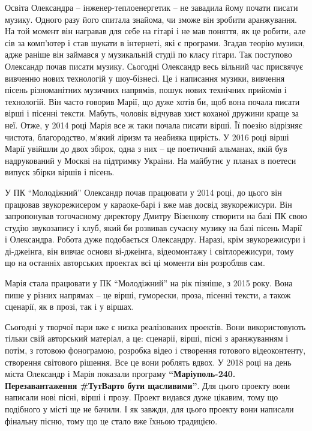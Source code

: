 
Освіта Олександра – інженер-теплоенергетик – не завадила йому почати писати
музику. Одного разу його спитала знайома, чи зможе він зробити аранжування. На
той момент він награвав для себе на гітарі і не мав поняття, як це робити, але
сів за комп'ютер і став шукати в інтернеті, які є програми. Згадав теорію
музики, адже раніше він займався у музикальній студії по класу гітари. Так
поступово Олександр почав писати музику. Сьогодні Олександр весь вільний час
присвячує вивченню нових технологій у шоу-бізнесі. Це і написання музики,
вивчення пісень різноманітних музичних напрямів, пошук нових технічних прийомів
і технологій. Він часто говорив Марії, що дуже хотів би, щоб вона почала писати
вірші і пісенні тексти. Мабуть, чоловік відчував хист коханої дружини краще за
неї. Отже, у 2014 році Марія все ж таки почала писати вірші. Її поезію
відрізняє чистота, благородство, м'який ліризм та неабияка щирість. У 2016 році
вірші Марії увійшли до двох збірок, одна з них – це поетичний альманах, якій
був надрукований у Москві на підтримку України. На майбутнє у планах в поетеси
випуск збірки віршів і пісень.

У ПК \enquote{Молодіжний} Олександр почав працювати у 2014 році, до цього він працював
звукорежисером у караоке-барі і вже мав досвід звукорежисури. Він запропонував
тогочасному директору Дмитру Візенкову створити на базі ПК свою студію
звукозапису і клуб, який би розвивав сучасну музику на базі пісень Марії і
Олександра. Робота дуже подобається Олександру. Наразі, крім звукорежисури і
ді-джеінга, він вивчає основи ві-джеінга, відеомонтажу і світлорежисури, тому
що на останніх авторських проектах всі ці моменти він розробляв сам.



Марія стала працювати у ПК \enquote{Молодіжний} на рік пізніше, з 2015 року. Вона пише
у різних напрямах – це вірші, гуморески, проза, пісенні тексти, а також
сценарії, як в прозі, так і у віршах.

Сьогодні у творчої пари вже є низка реалізованих проектів. Вони використовують
тільки свій авторський матеріал, а це: сценарії, вірші, пісні з аранжуванням і
потім, з готовою фонограмою, розробка відео і створення готового відеоконтенту,
створення світового рішення. Все це вони роблять вдвох. У 2018 році на день
міста Олександр і Марія показали програму \textbf{\enquote{Маріуполь-240. Перезавантаження
\#ТутВарто бути щасливими}}. Для цього проекту вони написали нові пісні, вірші і
прозу. Проект видався дуже цікавим, тому що подібного у місті ще не бачили. І
як завжди, для цього проекту вони написали фінальну пісню, тому що це стало вже
їхньою традицією.

